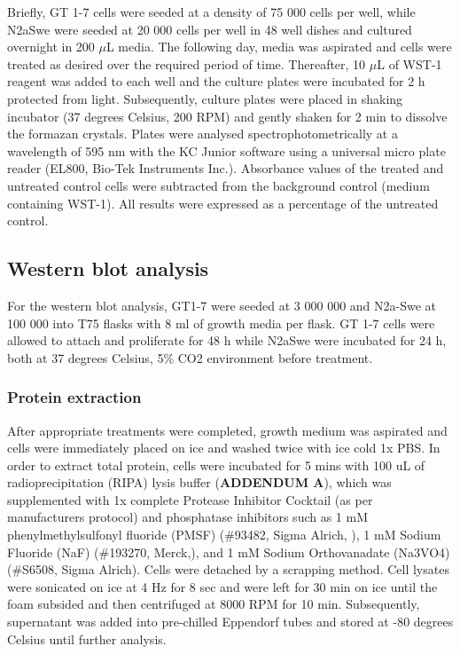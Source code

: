 Briefly, GT 1-7 cells were seeded at a density of 75 000 cells per well, while N2aSwe were seeded at 20 000 cells per well in 48 well dishes and cultured overnight in 200 $\mu$L media. The following day, media was aspirated and cells were treated as desired over the required period of time. Thereafter, 10 $\mu$L of WST-1 reagent was added to each well and the culture plates were incubated for 2 h protected from light. Subsequently, culture plates were placed in shaking incubator (37 degrees Celsius, 200 RPM) and gently shaken for 2 min to dissolve the formazan crystals. Plates were analysed spectrophotometrically at a wavelength of 595 nm with the KC Junior software using a universal micro plate reader (EL800, Bio-Tek Instruments Inc.). Absorbance values of the treated and untreated control cells were subtracted from the background control (medium containing WST-1). All results were expressed as a percentage of the untreated control.

\subsection{Western blot analysis}
For the western blot analysis, GT1-7 were seeded at 3 000 000 and N2a-Swe at 100 000 into T75 flasks with 8 ml of growth media per flask. GT 1-7 cells were allowed to attach and proliferate for 48 h while N2aSwe were incubated for 24 h, both at 37 degrees Celsius, 5\% CO2 environment before treatment.

\subsubsection{Protein extraction}
After appropriate treatments were completed, growth medium was aspirated and cells were immediately placed on ice and washed twice with ice cold 1x PBS. In order to extract total protein, cells were incubated for 5 mins with 100 uL of radioprecipitation (RIPA) lysis buffer (\textbf{ADDENDUM A}), which was supplemented with 1x complete Protease Inhibitor Cocktail (as per manufacturers protocol) and phosphatase inhibitors such as 1 mM phenylmethylsulfonyl fluoride (PMSF) (\#93482, Sigma Alrich, ), 1 mM Sodium Fluoride (NaF) (\#193270, Merck,), and 1 mM Sodium Orthovanadate (Na3VO4) (\#S6508, Sigma Alrich). Cells were detached by a scrapping method. Cell lysates were sonicated on ice at 4 Hz for 8 sec and were left for 30 min on ice until the foam subsided and then centrifuged at 8000 RPM for 10 min. Subsequently, supernatant was added into pre-chilled Eppendorf tubes and stored at -80 degrees Celsius until further analysis.

